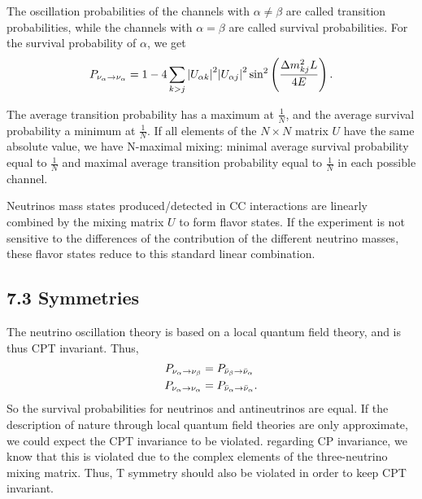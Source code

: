 \documentclass[twocolumn]{article}
\begin{document}
The oscillation probabilities of the channels with $\alpha \neq \beta$ are called transition probabilities, while the channels with $\alpha = \beta$ are called survival probabilities. For the survival probability of $\alpha$, we get 
\begin{align*}
  P_{\nu_\alpha \to \nu_\alpha} = 1-4\sum_{k > j}\abs{U_{\alpha k}}^2 \abs{U_{\alpha j}}^2 \sin^2 \left( \frac{\Delta m_{kj}^2 L}{4E} \right)
.\end{align*}

The average transition probability has a maximum at $\frac{1}{N}$, and the average survival probability a minimum at $\frac{1}{N}$. If all elements of the $N \times N$ matrix $U$ have the same absolute value, we have N-maximal mixing: minimal average survival probability equal to $\frac{1}{N}$ and maximal average transition probability equal to $\frac{1}{N}$ in each possible channel. 

Neutrinos mass states produced/detected in CC interactions are linearly combined by the mixing matrix $U$ to form flavor states. If the experiment is not sensitive to the differences of the contribution of the different neutrino masses, these flavor states reduce to this standard linear combination. 

\subsection*{7.3 Symmetries}
The neutrino oscillation theory is based on a local quantum field theory, and is thus CPT invariant. Thus,
\begin{align*}
  P_{\nu_\alpha \to \nu_\beta} &= P_{\bar{\nu}_\beta \to \bar{\nu}_\alpha} \\
  P_{\nu_\alpha \to \nu_\alpha} &= P_{\bar{\nu}_\alpha \to \bar{\nu}_\alpha} 
.\end{align*}
So the survival probabilities for neutrinos and antineutrinos are equal. If the description of nature through local quantum field theories are only approximate, we could expect the CPT invariance to be violated. 
regarding CP invariance, we know that this is violated due to the complex elements of the three-neutrino mixing matrix. Thus, T symmetry should also be violated in order to keep CPT invariant.
\end{document}
